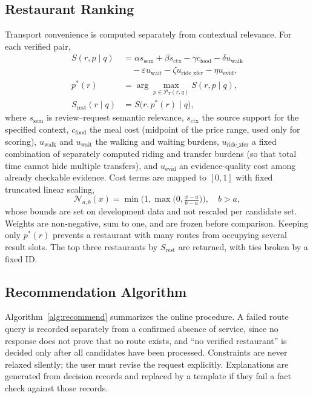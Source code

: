 \documentclass[conference]{IEEEtran}
\begin{document}
\subsection{Restaurant Ranking}
Transport convenience is computed separately from contextual relevance. For each verified pair,
\begin{equation}\label{eq:ranking}
\begin{aligned}
S(r,p\mid q) &= \alpha s_{\mathrm{sem}}+\beta s_{\mathrm{ctx}}-\gamma c_{\mathrm{food}}-\delta u_{\mathrm{walk}}\\
&\quad-\varepsilon u_{\mathrm{wait}}-\zeta u_{\mathrm{ride\_xfer}}-\eta u_{\mathrm{evid}},\\
p^*(r) &= \arg\max_{p\in\mathcal{P}_T(r,q)} S(r,p\mid q),\\
S_{\mathrm{rest}}(r\mid q) &= S\big(r,p^*(r)\mid q\big),
\end{aligned}
\end{equation}
where $s_{\mathrm{sem}}$ is review--request semantic relevance, $s_{\mathrm{ctx}}$ the source support for the specified context, $c_{\mathrm{food}}$ the meal cost (midpoint of the price range, used only for scoring), $u_{\mathrm{walk}}$ and $u_{\mathrm{wait}}$ the walking and waiting burdens, $u_{\mathrm{ride\_xfer}}$ a fixed combination of separately computed riding and transfer burdens (so that total time cannot hide multiple transfers), and $u_{\mathrm{evid}}$ an evidence-quality cost among already checkable evidence. Cost terms are mapped to $[0,1]$ with fixed truncated linear scaling,
\begin{equation}
\mathcal{N}_{a,b}(x)=\min\!\Big(1,\max\!\Big(0,\tfrac{x-a}{b-a}\Big)\Big),\quad b>a,
\end{equation}
whose bounds are set on development data and not rescaled per candidate set. Weights are non-negative, sum to one, and are frozen before comparison. Keeping only $p^*(r)$ prevents a restaurant with many routes from occupying several result slots. The top three restaurants by $S_{\mathrm{rest}}$ are returned, with ties broken by a fixed ID.

\subsection{Recommendation Algorithm}
Algorithm~\ref{alg:recommend} summarizes the online procedure. A failed route query is recorded separately from a confirmed absence of service, since no response does not prove that no route exists, and ``no verified restaurant'' is decided only after all candidates have been processed. Constraints are never relaxed silently; the user must revise the request explicitly. Explanations are generated from decision records and replaced by a template if they fail a fact check against those records.
\end{document}

